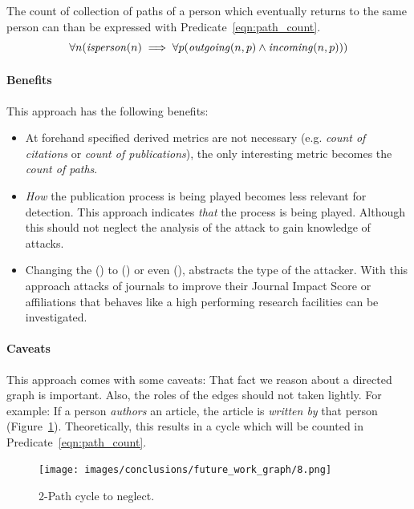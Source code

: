 \documentclass{ou-report}
\begin{document}
The count of collection of paths of a person which eventually returns to 
the same person can than be expressed with Predicate~\ref{eqn:path_count}.
\begin{equation}
\label{eqn:path_count}
\forall n (\mathit{isperson}(n) \implies \forall p(\mathit{outgoing}(n, p) \land \mathit{incoming}(n, p)))
\end{equation}


\paragraph{Benefits}
This approach has the following benefits:
\begin{itemize}
    \item At forehand specified derived metrics are not necessary (e.g. 
        \textit{count of citations} or \textit{count of publications}), the only 
        interesting metric becomes the \textit{count of paths}.
    \item \textit{How} the publication process is being played becomes less 
        relevant for detection. This approach indicates \textit{that} the 
        process is being played. Although this should not neglect the analysis
        of the attack to gain knowledge of attacks.
    \item Changing the \isperson() to \isjournal() or even \isaffiliation(),
        abstracts the type of the attacker. With this approach 
        attacks of journals to improve their Journal Impact Score or 
        affiliations that behaves like a high performing research facilities can
        be investigated.
\end{itemize}

\paragraph{Caveats}
This approach comes with some caveats:
That fact we reason about a directed graph is important. Also, the 
roles of the edges should not taken lightly. For example: If a person
\textit{authors} an article, the article is \textit{written by} that person 
(Figure~\ref{fig:graph_8}). Theoretically, this results in a cycle which will be 
counted in Predicate~\ref{eqn:path_count}.
  
\begin{figure}[H]
    \centering
    \texttt{[image: images/conclusions/future\_work\_graph/8.png]}
    \caption{2-Path cycle to neglect.}
    \label{fig:graph_8}
\end{figure}
\end{document}
